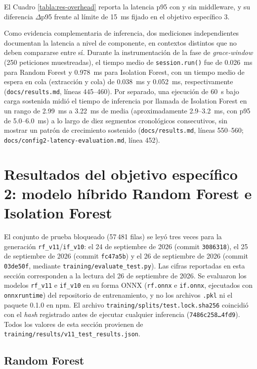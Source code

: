 El Cuadro \ref{tabla:res-overhead} reporta la latencia p95 con y sin middleware, y su diferencia $\Delta$p95 frente al límite de 15~ms fijado en el objetivo específico 3.

Como evidencia complementaria de inferencia, dos mediciones independientes documentan la latencia a nivel de componente, en contextos distintos que no deben compararse entre sí. Durante la instrumentación de la fase de \textit{grace-window} (250 peticiones muestreadas), el tiempo medio de \texttt{session.run()} fue de 0.026~ms para Random Forest y 0.978~ms para Isolation Forest, con un tiempo medio de espera en cola (extracción y cola) de 0.038~ms y 0.052~ms, respectivamente (\texttt{docs/results.md}, líneas 445--460). Por separado, una ejecución de 60~s bajo carga sostenida midió el tiempo de inferencia por llamada de Isolation Forest en un rango de 2.99~ms a 3.22~ms de media (aproximadamente 2.9--3.2~ms, con p95 de 5.0--6.0~ms) a lo largo de diez segmentos cronológicos consecutivos, sin mostrar un patrón de crecimiento sostenido (\texttt{docs/results.md}, líneas 550--560; \texttt{docs/config2-latency-evaluation.md}, línea 452).

\section{Resultados del objetivo específico 2: modelo híbrido Random Forest e Isolation Forest}

El conjunto de prueba bloqueado (57\,481 filas) se leyó tres veces para la generación \texttt{rf\_v11}/\texttt{if\_v10}: el 24 de septiembre de 2026 (commit \texttt{3086318}), el 25 de septiembre de 2026 (commit \texttt{fc47a5b}) y el 26 de septiembre de 2026 (commit \texttt{03de50f}, mediante \texttt{training/evaluate\_test.py}). Las cifras reportadas en esta sección corresponden a la lectura del 26 de septiembre de 2026. Se evaluaron los modelos \texttt{rf\_v11} e \texttt{if\_v10} en su forma ONNX (\texttt{rf.onnx} e \texttt{if.onnx}, ejecutados con \texttt{onnxruntime}) del repositorio de entrenamiento, y no los archivos \texttt{.pkl} ni el paquete 0.1.0 en npm. El archivo \texttt{training/splits/test.lock.sha256} coincidió con el \textit{hash} registrado antes de ejecutar cualquier inferencia (\texttt{7486c258\ldots 4fd9}). Todos los valores de esta sección provienen de \texttt{training/results/v11\_test\_results.json}.

\subsection{Random Forest}

